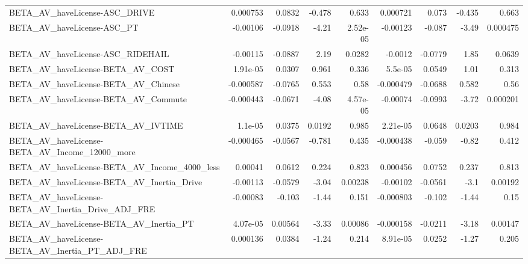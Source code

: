 \begin{tabular}{lrrrrrrrr}
BETA\_AV\_haveLicense-ASC\_DRIVE                      &    0.000753 &       0.0832 &   -0.478 &    0.633 &   0.000721 &       0.073 &       -0.435 &         0.663 \\
BETA\_AV\_haveLicense-ASC\_PT                         &    -0.00106 &      -0.0918 &    -4.21 & 2.52e-05 &   -0.00123 &      -0.087 &        -3.49 &      0.000475 \\
BETA\_AV\_haveLicense-ASC\_RIDEHAIL                   &    -0.00115 &      -0.0887 &     2.19 &   0.0282 &    -0.0012 &     -0.0779 &         1.85 &        0.0639 \\
BETA\_AV\_haveLicense-BETA\_AV\_COST                   &    1.91e-05 &       0.0307 &    0.961 &    0.336 &    5.5e-05 &      0.0549 &         1.01 &         0.313 \\
BETA\_AV\_haveLicense-BETA\_AV\_Chinese                &   -0.000587 &      -0.0765 &    0.553 &     0.58 &  -0.000479 &     -0.0688 &        0.582 &          0.56 \\
BETA\_AV\_haveLicense-BETA\_AV\_Commute                &   -0.000443 &      -0.0671 &    -4.08 & 4.57e-05 &   -0.00074 &     -0.0993 &        -3.72 &      0.000201 \\
BETA\_AV\_haveLicense-BETA\_AV\_IVTIME                 &     1.1e-05 &       0.0375 &   0.0192 &    0.985 &   2.21e-05 &      0.0648 &       0.0203 &         0.984 \\
BETA\_AV\_haveLicense-BETA\_AV\_Income\_12000\_more      &   -0.000465 &      -0.0567 &   -0.781 &    0.435 &  -0.000438 &      -0.059 &        -0.82 &         0.412 \\
BETA\_AV\_haveLicense-BETA\_AV\_Income\_4000\_less       &     0.00041 &       0.0612 &    0.224 &    0.823 &   0.000456 &      0.0752 &        0.237 &         0.813 \\
BETA\_AV\_haveLicense-BETA\_AV\_Inertia\_Drive          &    -0.00113 &      -0.0579 &    -3.04 &  0.00238 &   -0.00102 &     -0.0561 &         -3.1 &       0.00192 \\
BETA\_AV\_haveLicense-BETA\_AV\_Inertia\_Drive\_ADJ\_FRE  &    -0.00083 &       -0.103 &    -1.44 &    0.151 &  -0.000803 &      -0.102 &        -1.44 &          0.15 \\
BETA\_AV\_haveLicense-BETA\_AV\_Inertia\_PT             &    4.07e-05 &      0.00564 &    -3.33 &  0.00086 &  -0.000158 &     -0.0211 &        -3.18 &       0.00147 \\
BETA\_AV\_haveLicense-BETA\_AV\_Inertia\_PT\_ADJ\_FRE     &    0.000136 &       0.0384 &    -1.24 &    0.214 &   8.91e-05 &      0.0252 &        -1.27 &         0.205 \\

\end{tabular}
